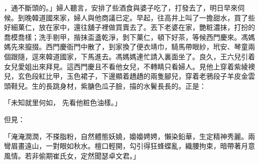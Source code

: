 ，通不斷頭的。」婦人聽言，安排了些酒食與婆子吃了，打發去了，明日早來伺候。到晚韓道國來家，婦人與他商議已定。早起，往高井上叫了一擔甜水，買了些好細菓仁，放在家中，還往舖子裡做買賣去了。丟下老婆在家，艷粧濃抹，打扮的喬模喬樣；洗手剔甲，揩抹盃盞乾淨，剝下菓仁，頓下好茶，等候西門慶來。馮媽媽先來攛掇。西門慶衙門中散了，到家換了便衣靖巾，騎馬帶眼紗，玳安、琴童兩個跟隨，逕來韓道國家，下馬進去。馮媽媽連忙請入裏面坐了。良久，王六兒引着女兒愛姐出來拜見。這西門慶且不看他女兒，不轉睛只看婦人。見他上穿着紫綾襖兒，玄色段紅比甲，玉色裙子，下邊顯着趫趫的兩隻腳兒，穿着老鴉段子羊皮金雲頭鞋兒。生的長跳身材，紫膅色瓜子臉，描的水鬢長長的。正是：

「未知就里何如，  先看他粧色油樣。」

但見：

「淹淹潤潤，不搽脂粉，自然體態妖嬈，嬝嬝娉娉，懶染鉛華，生定精神秀麗。兩彎眉畫遠山，一對眼如秋水。檀口輕開，勾引得狂蜂蝶亂，織腰拘束，暗帶著月意風情。若非偷期崔氏女，定然聞瑟卓文君。」

